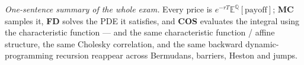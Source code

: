 \documentclass[11pt]{article}
\newcommand{\E}{\mathbb{E}}
\newcommand{\Q}{\mathbb{Q}}
\begin{document}
\vspace{4pt}
\noindent\emph{One-sentence summary of the whole exam.} Every price is $e^{-rT}\E^{\Q}[\text{payoff}]$;
\textbf{MC} samples it, \textbf{FD} solves the PDE it satisfies, and \textbf{COS} evaluates the integral using
the characteristic function --- and the same characteristic function / affine structure, the same Cholesky
correlation, and the same backward dynamic-programming recursion reappear across Bermudans, barriers, Heston
and jumps.
\end{document}
